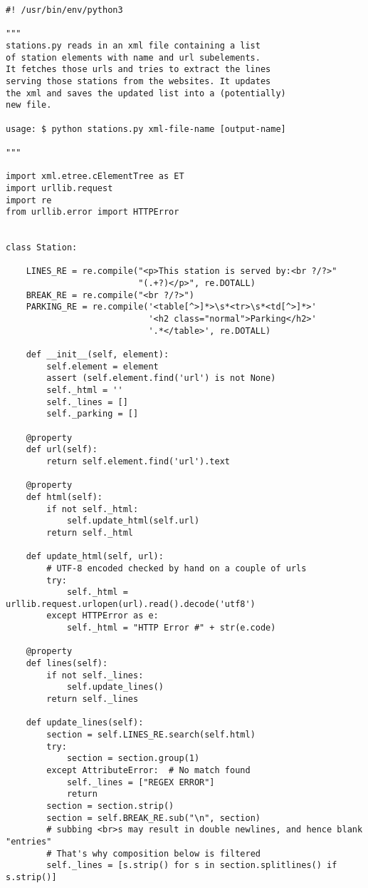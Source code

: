 \documentclass[12pt,titlepage]{article}
\begin{document}
\begin{verbatim}
#! /usr/bin/env/python3

"""
stations.py reads in an xml file containing a list
of station elements with name and url subelements.
It fetches those urls and tries to extract the lines
serving those stations from the websites. It updates
the xml and saves the updated list into a (potentially)
new file.

usage: $ python stations.py xml-file-name [output-name]

"""

import xml.etree.cElementTree as ET
import urllib.request
import re
from urllib.error import HTTPError


class Station:

    LINES_RE = re.compile("<p>This station is served by:<br ?/?>"
                          "(.+?)</p>", re.DOTALL)
    BREAK_RE = re.compile("<br ?/?>")
    PARKING_RE = re.compile('<table[^>]*>\s*<tr>\s*<td[^>]*>'
                            '<h2 class="normal">Parking</h2>'
                            '.*</table>', re.DOTALL)

    def __init__(self, element):
        self.element = element
        assert (self.element.find('url') is not None)
        self._html = ''
        self._lines = []
        self._parking = []

    @property
    def url(self):
        return self.element.find('url').text

    @property
    def html(self):
        if not self._html:
            self.update_html(self.url)
        return self._html

    def update_html(self, url):
        # UTF-8 encoded checked by hand on a couple of urls
        try:
            self._html = urllib.request.urlopen(url).read().decode('utf8')
        except HTTPError as e:
            self._html = "HTTP Error #" + str(e.code)

    @property
    def lines(self):
        if not self._lines:
            self.update_lines()
        return self._lines

    def update_lines(self):
        section = self.LINES_RE.search(self.html)
        try:
            section = section.group(1)
        except AttributeError:  # No match found
            self._lines = ["REGEX ERROR"]
            return
        section = section.strip()
        section = self.BREAK_RE.sub("\n", section)
        # subbing <br>s may result in double newlines, and hence blank "entries"
        # That's why composition below is filtered
        self._lines = [s.strip() for s in section.splitlines() if s.strip()]


\end{verbatim}
\end{document}
